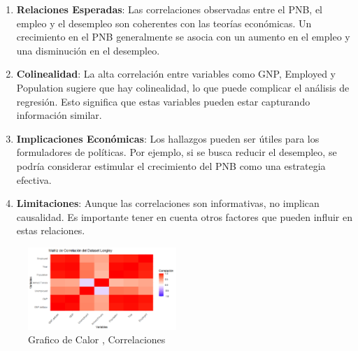 \documentclass{article}
\begin{document}
\begin{enumerate}
    \item \textbf{Relaciones Esperadas}: Las correlaciones observadas entre el PNB, el empleo y el desempleo son coherentes con las teorías económicas. Un crecimiento en el PNB generalmente se asocia con un aumento en el empleo y una disminución en el desempleo.
    
    \item \textbf{Colinealidad}: La alta correlación entre variables como GNP, Employed y Population sugiere que hay colinealidad, lo que puede complicar el análisis de regresión. Esto significa que estas variables pueden estar capturando información similar.
    
    \item \textbf{Implicaciones Económicas}: Los hallazgos pueden ser útiles para los formuladores de políticas. Por ejemplo, si se busca reducir el desempleo, se podría considerar estimular el crecimiento del PNB como una estrategia efectiva.
    
    \item \textbf{Limitaciones}: Aunque las correlaciones son informativas, no implican causalidad. Es importante tener en cuenta otros factores que pueden influir en estas relaciones.
\end{enumerate}

\begin{figure}[h] %
    \centering %
    \includegraphics[width=0.5\textwidth]{Correlacion.png}
    \caption{Grafico de Calor , Correlaciones } %
    \label{fig:mi_imagen} %
    \vspace{0.5cm} %
\end{figure}
\end{document}
